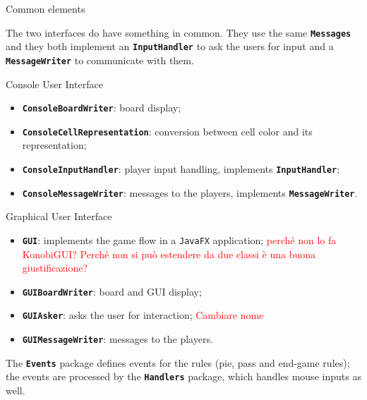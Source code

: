 \documentclass{beamer}
\begin{document}
  \begin{frame} {Common elements}

    The two interfaces do have something in common. They use the same \texttt{\textbf{Messages}} and they both implement an \textbf{\texttt{InputHandler}} to ask the users for input and a \textbf{\texttt{MessageWriter}} to communicate with them.

  \end{frame}




  \begin{frame}{Console User Interface}

    \begin{itemize}
      \setlength\itemsep{1em}
      \item \textbf{\texttt{ConsoleBoardWriter}}: board display;
      \item \textbf{\texttt{ConsoleCellRepresentation}}: conversion between cell color and its representation;
      \item \textbf{\texttt{ConsoleInputHandler}}: player input handling, implements \textbf{\texttt{InputHandler}};
      \item \textbf{\texttt{ConsoleMessageWriter}}: messages to the players, implements \textbf{\texttt{MessageWriter}}.
    \end{itemize}

  \end{frame}



  \begin{frame}{Graphical User Interface}

    \begin{itemize}
      \setlength\itemsep{1em}
      \item \textbf{\texttt{GUI}}: implements the game flow in a \texttt{JavaFX} application; \textcolor{red}{perché non lo fa KonobiGUI? Perché non si può estendere da due classi è una buona giustificazione?}
      \item \textbf{\texttt{GUIBoardWriter}}: board and GUI display;
      \item \textbf{\texttt{GUIAsker}}: asks the user for interaction; \textcolor{red}{Cambiare nome}
      \item \textbf{\texttt{GUIMessageWriter}}: messages to the players.
    \end{itemize}

    \vspace{1em}

    The \textbf{\texttt{Events}} package defines events for the rules (pie, pass and end-game rules); the events are processed by the \textbf{\texttt{Handlers}} package, which handles mouse inputs as well.

  \end{frame}
\end{document}

